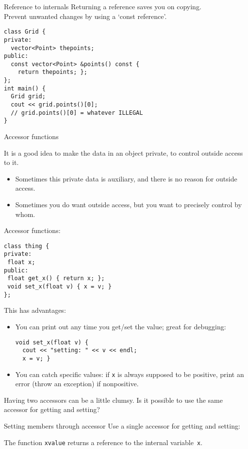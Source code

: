 \begin{block}{Reference to internals}
  \label{sl:obj-return-const-ref}
  Returning a reference saves you on copying.\\
  Prevent unwanted changes by using a `const reference'.
\begin{lstlisting}
class Grid {
private:
  vector<Point> thepoints;
public:
  const vector<Point> &points() const {
    return thepoints; };
};
int main() {
  Grid grid;
  cout << grid.points()[0];
  // grid.points()[0] = whatever ILLEGAL
}
\end{lstlisting}
\end{block}

 {Accessor functions}

It is a good idea to make the data in an object private,
to control outside access to it.
\begin{itemize}
\item Sometimes this private data is auxiliary, and there is no reason
  for outside access.
\item Sometimes you do want outside access, but you want to precisely
  control by whom.
\end{itemize}

Accessor functions:
\begin{lstlisting}
class thing {
private:
 float x;
public:
 float get_x() { return x; };
 void set_x(float v) { x = v; }
};
\end{lstlisting}
This has advantages:
\begin{itemize}
\item You can print out any time you get/set the value; great for
  debugging:
\begin{lstlisting}
void set_x(float v) {
  cout << "setting: " << v << endl;
  x = v; }
\end{lstlisting}
\item You can catch specific values: if \lstinline{x} is always supposed to be
  positive, print an error (throw an exception) if nonpositive.
\end{itemize}

Having two accessors can be a little clumsy. Is it possible to use the
same accessor for getting and setting?

\begin{block}{Setting members through accessor}
  \label{sl:setmember}
  Use a single accessor for getting and setting:

  The function \lstinline{xvalue} returns a reference to the internal
  variable~\lstinline{x}.
\end{block}

